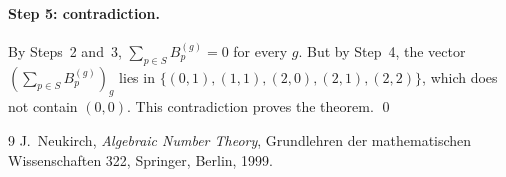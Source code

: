 \documentclass[11pt]{article}
\begin{document}
\paragraph{Step 5: contradiction.} By Steps~2 and~3, $\sum_{p\in S}B^{(g)}_p=0$ for every $g$. But by Step~4, the vector $(\sum_{p\in S}B^{(g)}_p)_g$ lies in $\{(0,1),\allowbreak (1,1),\allowbreak (2,0),\allowbreak (2,1),\allowbreak (2,2)\}$, which does not contain $(0,0)$. This contradiction proves the theorem.
\qed


\begin{thebibliography}{9}
 J.~Neukirch, \emph{Algebraic Number Theory}, Grundlehren der mathematischen Wissenschaften 322, Springer, Berlin, 1999.
\end{thebibliography}

\clearpage
\begingroup\small
\setlength{\LTcapwidth}{\textwidth}
\end{document}
